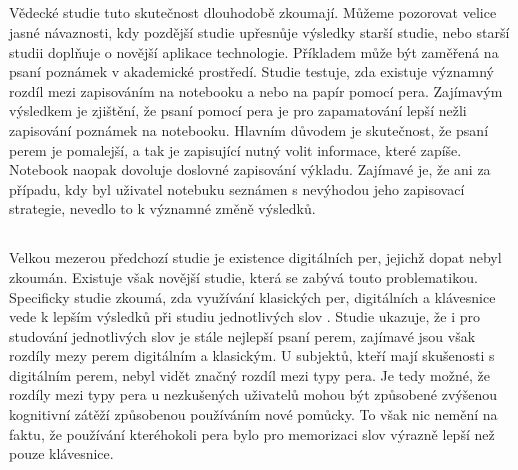 \documentclass[journal]{IEEEtran}
\begin{document}
\subsection{}
Vědecké studie tuto skutečnost dlouhodobě zkoumají.
Můžeme pozorovat velice jasné návaznosti, kdy pozdější studie upřesnůje výsledky starší studie, nebo starší studii doplňuje o novější aplikace technologie.
Příkladem může být zaměřená na psaní poznámek v akademické prostředí\cite{mightier_pen}. Studie testuje, zda existuje významný rozdíl mezi zapisováním na notebooku a nebo na papír pomocí pera.
Zajímavým výsledkem je zjištění, že psaní pomocí pera je pro zapamatování lepší nežli zapisování poznámek na notebooku.
Hlavním důvodem je skutečnost, že psaní perem je pomalejší, a tak je zapisující nutný volit informace, které zapíše.
Notebook naopak dovoluje doslovné zapisování výkladu.
Zajímavé je, že ani za případu, kdy byl uživatel notebuku seznámen s nevýhodou jeho zapisovací strategie, nevedlo to k významné změně výsledků.

\subsection{}
Velkou mezerou předchozí studie je existence digitálních per, jejichž dopat nebyl zkoumán.
Existuje však novější studie, která se zabývá touto problematikou.
Specificky studie zkoumá, zda využívání klasických per, digitálních a klávesnice vede k lepším výsledků při studiu jednotlivých slov
\cite{advantage_of_handwriting}.
Studie ukazuje, že i pro studování jednotlivých slov je stále nejlepší psaní perem, zajímavé jsou však rozdíly mezy perem digitálním a klasickým.
U subjektů, kteří mají skušenosti s digitálním perem, nebyl vidět značný rozdíl mezi typy pera.
Je tedy možné, že rozdíly mezi typy pera u nezkušených uživatelů mohou být způsobené zvýšenou kognitivní zátěží způsobenou používáním nové pomůcky. To však nic nemění na faktu, že používání kteréhokoli pera bylo pro memorizaci slov výrazně lepší než pouze klávesnice.
\end{document}
